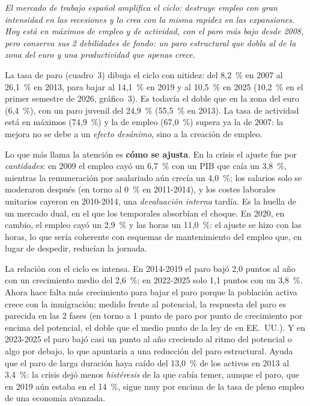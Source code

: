 \begin{examen}
\textit{El mercado de trabajo español amplifica el ciclo: destruye empleo con gran intensidad en las recesiones y lo crea con la misma rapidez en las expansiones. Hoy está en máximos de empleo y de actividad, con el paro más bajo desde 2008, pero conserva sus 2 debilidades de fondo: un paro estructural que dobla al de la zona del euro y una productividad que apenas crece.}

La tasa de paro (cuadro~3) dibuja el ciclo con nitidez: del 8,2~\% en 2007 al 26,1~\% en 2013, para bajar al 14,1~\% en 2019 y al 10,5~\% en 2025 (10,2~\% en el primer semestre de 2026, gráfico~3). Es todavía el doble que en la zona del euro (6,4~\%), con un paro juvenil del 24,9~\% (55,5~\% en 2013). La tasa de actividad está en máximos (74,9~\%) y la de empleo (67,0~\%) supera ya la de 2007: la mejora no se debe a un \emph{efecto desánimo}, sino a la creación de empleo.

Lo que más llama la atención es \textbf{cómo se ajusta}. En la crisis el ajuste fue por \emph{cantidades}: en 2009 el empleo cayó un 6,7~\% con un PIB que caía un 3,8~\%, mientras la remuneración por asalariado aún crecía un 4,0~\%; los salarios solo se moderaron después (en torno al 0~\% en 2011-2014), y los costes laborales unitarios cayeron en 2010-2014, una \emph{devaluación interna} tardía. Es la huella de un mercado dual, en el que los temporales absorbían el choque. En 2020, en cambio, el empleo cayó un 2,9~\% y las horas un 11,0~\%: el ajuste se hizo con las horas, lo que sería coherente con esquemas de mantenimiento del empleo que, en lugar de despedir, reducían la jornada.

La relación con el ciclo es intensa. En 2014-2019 el paro bajó 2,0 puntos al año con un crecimiento medio del 2,6~\%; en 2022-2025 solo 1,1 puntos con un 3,8~\%. Ahora hace falta más crecimiento para bajar el paro porque la población activa crece con la inmigración; medido frente al potencial, la respuesta del paro es parecida en las 2 fases (en torno a 1 punto de paro por punto de crecimiento por encima del potencial, el doble que el medio punto de la ley de  en EE.~UU.). Y en 2023-2025 el paro bajó casi un punto al año creciendo al ritmo del potencial o algo por debajo, lo que apuntaría a una reducción del paro estructural. Ayuda que el paro de larga duración haya caído del 13,0~\% de los activos en 2013 al 3,4~\%: la crisis dejó menos \emph{histéresis} de la que cabía temer, aunque el paro, que en 2019 aún estaba en el 14~\%, sigue muy por encima de la tasa de pleno empleo de una economía avanzada.


\end{examen}
